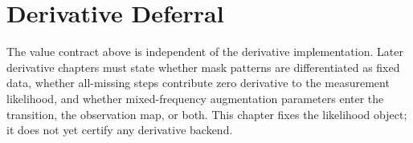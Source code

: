 \section{Derivative Deferral}
\label{sec:bf-missing-derivative-deferral}

The value contract above is independent of the derivative implementation.
Later derivative chapters must state whether mask patterns are differentiated
as fixed data, whether all-missing steps contribute zero derivative to the
measurement likelihood, and whether mixed-frequency augmentation parameters
enter the transition, the observation map, or both.  This chapter fixes the
likelihood object; it does not yet certify any derivative backend.
